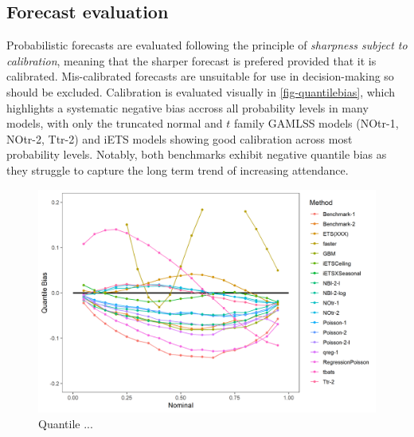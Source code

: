 \documentclass[]{elsarticle} %
\begin{document}
\hypertarget{forecast-evaluation}{%
\subsection{Forecast evaluation}\label{forecast-evaluation}}

Probabilistic forecasts are evaluated following the principle of \emph{sharpness subject to calibration}, meaning that the sharper forecast is prefered provided that it is calibrated. Mis-calibrated forecasts are unsuitable for use in decision-making so should be excluded. Calibration is evaluated visually in \ref{fig-quantilebias}, which highlights a systematic negative bias accross all probability levels in many models, with only the truncated normal and \(t\) family GAMLSS models (NOtr-1, NOtr-2, Ttr-2) and iETS models showing good calibration across most probability levels. Notably, both benchmarks exhibit negative quantile bias as they struggle to capture the long term trend of increasing attendance.

\begin{figure}[H]

{\centering \includegraphics[width=0.9\linewidth]{../results/QuantileBias} 

}

\caption{Quantile ...}\label{fig:fig-quantilebias}
\end{figure}
\end{document}
